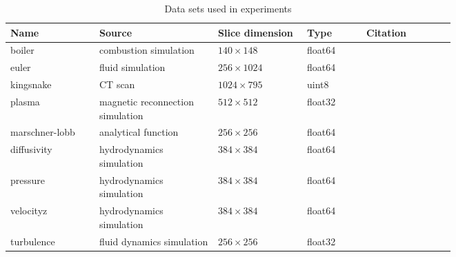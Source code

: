 \begin{table}[t]
  \caption{Data sets used in experiments}
  \centering
  \begin{tabular}{p{0.15\linewidth}p{0.20\linewidth}p{0.15\linewidth}p{0.10\linewidth}p{0.15\linewidth}}
  \hline
  Name & Source & Slice dimension & Type & Citation\\
  \hline
  boiler & combustion simulation& $140\times 148$ & float64 &\\
  euler & fluid simulation& $256\times 1024$ & float64 &\\
  kingsnake & CT scan & $1024\times 795$ & uint8 &\\
  plasma & magnetic reconnection simulation& $512\times 512$ & float32 &\\
  marschner-lobb & analytical function& $256\times 256$ & float64 &\\
  diffusivity & hydrodynamics simulation& $384\times 384$ & float64 &\\
  pressure & hydrodynamics simulation& $384\times 384$ & float64 &\\
  velocityz & hydrodynamics simulation& $384\times 384$ & float64 &\\
  turbulence & fluid dynamics simulation& $256\times 256$ & float32 &\\
  \hline
  \end{tabular}
\label{tbl:data-sets}
\end{table}

